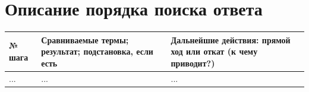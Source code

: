 \documentclass[12pt]{report}
\begin{document}
\section*{Описание порядка поиска ответа}

\begin{table}[H]
	\begin{center}
		\begin{tabular}{|p{1 cm}|p{9 cm}|p{9 cm}|}
			\hline
			№ шага & Сравниваемые термы; результат; подстановка, если есть & Дальнейшие действия: прямой ход или откат (к чему приводит?) \\
			\hline 
			... & ... & ... \\
			\hline
		\end{tabular}
	\end{center}
\end{table} 
\end{document}
